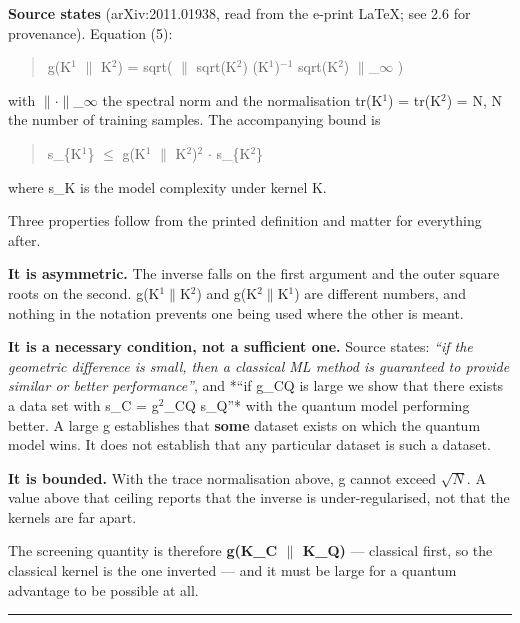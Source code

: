 \documentclass[
  10pt,
]{article}
\begin{document}
\textbf{Source states} (arXiv:2011.01938, read from the e-print LaTeX;
see 2.6 for provenance). Equation (5):

\begin{quote}
g(K\(^{1}\) \(\|\) K\(^{2}\)) = sqrt( \(\|\) sqrt(K\(^{2}\))
(K\(^{1}\))\(^{-1}\) sqrt(K\(^{2}\)) \(\|\)\_\(\infty\) )
\end{quote}

with \(\|\)\(\cdot\)\(\|\)\_\(\infty\) the spectral norm and the
normalisation tr(K\(^{1}\)) = tr(K\(^{2}\)) = N, N the number of
training samples. The accompanying bound is

\begin{quote}
s\_\{K\(^{1}\)\} \(\le\) g(K\(^{1}\) \(\|\) K\(^{2}\))\(^{2}\) \(\cdot\)
s\_\{K\(^{2}\)\}
\end{quote}

where s\_K is the model complexity under kernel K.

Three properties follow from the printed definition and matter for
everything after.

\textbf{It is asymmetric.} The inverse falls on the first argument and
the outer square roots on the second. g(K\(^{1}\)\(\|\)K\(^{2}\)) and
g(K\(^{2}\)\(\|\)K\(^{1}\)) are different numbers, and nothing in the
notation prevents one being used where the other is meant.

\textbf{It is a necessary condition, not a sufficient one.} Source
states: \emph{``if the geometric difference is small, then a classical
ML method is guaranteed to provide similar or better performance''}, and
*``if g\_CQ is large we show that there exists a data set with s\_C =
g\(^{2}\)\_CQ s\_Q''* with the quantum model performing better. A large
g establishes that \textbf{some} dataset exists on which the quantum
model wins. It does not establish that any particular dataset is such a
dataset.

\textbf{It is bounded.} With the trace normalisation above, g cannot
exceed \(\sqrt{N}\). A value above that ceiling reports that the inverse
is under-regularised, not that the kernels are far apart.

The screening quantity is therefore \textbf{g(K\_C \(\|\) K\_Q)} ---
classical first, so the classical kernel is the one inverted --- and it
must be large for a quantum advantage to be possible at all.

\begin{center}\rule{0.5\linewidth}{0.5pt}\end{center}
\end{document}
